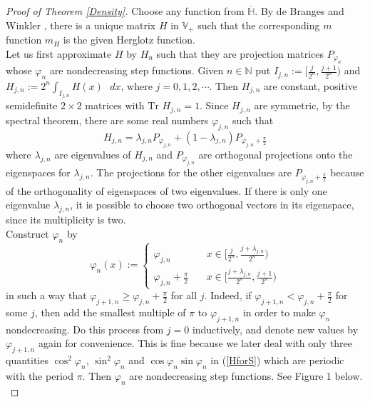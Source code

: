 \documentclass[preprint,12pt]{elsarticle}
\newcommand{\N}{{\mathbb N}}
\newcommand{\V}{{\mathbb V}}
\begin{document}
\begin{proof}[Proof of Theorem \ref{Density}]
Choose any function from $\overline{\mathbb H}$. By de Branges \cite{deB2} and Winkler \cite{Win}, there is a unique matrix $H$ in $\V_+$ such that the corresponding $m$ function $m_H$ is the given Herglotz function.\\ 

Let us first approximate $H$ by $H_n$ such that they are projection matrices $P_{\varphi_n}$  whose $\varphi_n$ are nondecreasing step functions.  
Given $n\in\N$ put $I_{j,n}:=[\frac{j}{2^n},\frac{j+1}{2^n})$ and $H_{j,n}:=2^n\int_{I_{j,n}}H(x)\textrm{ }dx$, where $j=0,1,2,\cdots$. Then $H_{j,n}$ are constant, positive semidefinite $2\times2$ matrices with $\textrm{Tr }H_{j,n}=1$. Since $H_{j,n}$ are symmetric, by the spectral theorem, there are some real numbers $\varphi_{j,n}$ such that 
\begin{equation*}
H_{j,n}=\lambda_{j,n}P_{\varphi_{j,n}}+(1-\lambda_{j,n})P_{\varphi_{j,n}+\frac{\pi}2}
\end{equation*}
where $\lambda_{j,n}$ are eigenvalues of $H_{j,n}$ and $P_{\varphi_{j,n}}$  are orthogonal projections onto the eigenspaces for $\lambda_{j,n}$. The projections for the other eigenvalues are $P_{\varphi_{j,n}+\frac{\pi}2}$ because of the orthogonality of eigenspaces of two eigenvalues. If there is only one eigenvalue $\lambda_{j,n}$, it is possible to choose two orthogonal vectors in its eigenspace, since its multiplicity is two.\\

Construct $\varphi_n$ by 
\begin{equation*}
\varphi_n(x) := \begin{cases} \varphi_{j,n} & \quad x\in [\frac{j}{2^n}, \frac{j+\lambda_{j,n}}{2^n}) \\  \varphi_{j,n}+\frac{\pi}2 & \quad x\in [\frac{j+\lambda_{j,n}}{2^n},\frac{j+1}{2^n}) \end{cases}
\end{equation*}
in such a way that $\varphi_{j+1,n}\ge \varphi_{j,n}+\frac{\pi}2$ for all $j$. Indeed, if $\varphi_{j+1,n}< \varphi_{j,n}+\frac{\pi}2$ for some $j$, then add the smallest multiple of $\pi$ to $\varphi_{j+1,n}$ in order to make $\varphi_n$ nondecreasing.  Do this process from $j=0$ inductively, and denote new values by $\varphi_{j+1,n}$ again for convenience.  This is fine because we later deal with only three quantities  $\cos^2\varphi_n$, $\sin^2\varphi_n$ and $\cos\varphi_n\sin\varphi_n$ in (\ref{HforS}) which are periodic with the period $\pi$. Then $\varphi_n$ are nondecreasing step functions. See Figure 1 below.\\



\end{proof}
\end{document}
